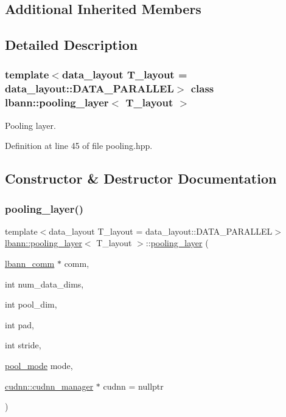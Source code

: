 \subsection*{Additional Inherited Members}


\subsection{Detailed Description}
\subsubsection*{template$<$data\+\_\+layout T\+\_\+layout = data\+\_\+layout\+::\+D\+A\+T\+A\+\_\+\+P\+A\+R\+A\+L\+L\+EL$>$\newline
class lbann\+::pooling\+\_\+layer$<$ T\+\_\+layout $>$}

Pooling layer. 

Definition at line 45 of file pooling.\+hpp.



\subsection{Constructor \& Destructor Documentation}
\mbox{\label{classlbann_1_1pooling__layer_a012223832bcd60644724425488059152}} 
\subsubsection{\texorpdfstring{pooling\+\_\+layer()}{pooling\_layer()}\hspace{0.1cm}{\footnotesize\ttfamily [1/3]}}
{\footnotesize\ttfamily template$<$data\+\_\+layout T\+\_\+layout = data\+\_\+layout\+::\+D\+A\+T\+A\+\_\+\+P\+A\+R\+A\+L\+L\+EL$>$ \\
\hyperlink{classlbann_1_1pooling__layer}{lbann\+::pooling\+\_\+layer}$<$ T\+\_\+layout $>$\+::\hyperlink{classlbann_1_1pooling__layer}{pooling\+\_\+layer} (\begin{DoxyParamCaption}\item[{\hyperlink{classlbann_1_1lbann__comm}{lbann\+\_\+comm} $\ast$}]{comm,  }\item[{int}]{num\+\_\+data\+\_\+dims,  }\item[{int}]{pool\+\_\+dim,  }\item[{int}]{pad,  }\item[{int}]{stride,  }\item[{\hyperlink{base_8hpp_ac47a6ee5278a53898222a48639a2bf39}{pool\+\_\+mode}}]{mode,  }\item[{\hyperlink{classlbann_1_1cudnn_1_1cudnn__manager}{cudnn\+::cudnn\+\_\+manager} $\ast$}]{cudnn = {\ttfamily nullptr} }\end{DoxyParamCaption})\hspace{0.3cm}{\ttfamily [inline]}}



